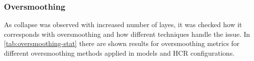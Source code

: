 \subsubsection{Oversmoothing}
  
As collapse was observed with increased number of layes, it was checked how it corresponds with oversmoothing
and how different techniques handle the issue. 
In \cref{tab:oversmoothing-stat} there are shown results for oversmoothing metrics for different 
oversmoothing methods applied in models and HCR configurations. 

